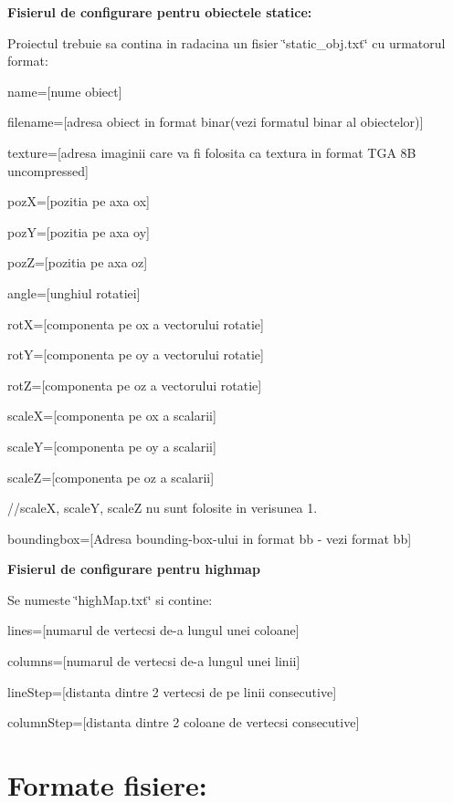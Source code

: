 {\bfseries Fisierul de configurare pentru obiectele statice\-:}\par
 Proiectul trebuie sa contina in radacina un fisier \char`\"{}static\-\_\-obj.\-txt\char`\"{} cu urmatorul format\-:\par
 name=\mbox{[}nume obiect\mbox{]}\par
 filename=\mbox{[}adresa obiect in format binar(vezi formatul binar al obiectelor)\mbox{]}\par
 texture=\mbox{[}adresa imaginii care va fi folosita ca textura in format T\-G\-A 8\-B uncompressed\mbox{]}\par
 poz\-X=\mbox{[}pozitia pe axa ox\mbox{]}\par
 poz\-Y=\mbox{[}pozitia pe axa oy\mbox{]}\par
 poz\-Z=\mbox{[}pozitia pe axa oz\mbox{]}\par
 angle=\mbox{[}unghiul rotatiei\mbox{]}\par
 rot\-X=\mbox{[}componenta pe ox a vectorului rotatie\mbox{]}\par
 rot\-Y=\mbox{[}componenta pe oy a vectorului rotatie\mbox{]}\par
 rot\-Z=\mbox{[}componenta pe oz a vectorului rotatie\mbox{]}\par
 scale\-X=\mbox{[}componenta pe ox a scalarii\mbox{]}\par
 scale\-Y=\mbox{[}componenta pe oy a scalarii\mbox{]}\par
 scale\-Z=\mbox{[}componenta pe oz a scalarii\mbox{]}\par
 //scale\-X, scale\-Y, scale\-Z nu sunt folosite in verisunea 1.\par
 boundingbox=\mbox{[}Adresa bounding-\/box-\/ului in format bb -\/ vezi format bb\mbox{]}\par
 {\bfseries Fisierul de configurare pentru highmap}\par
 Se numeste \char`\"{}high\-Map.\-txt\char`\"{} si contine\-:\par
 lines=\mbox{[}numarul de vertecsi de-\/a lungul unei coloane\mbox{]}\par
 columns=\mbox{[}numarul de vertecsi de-\/a lungul unei linii\mbox{]}\par
 line\-Step=\mbox{[}distanta dintre 2 vertecsi de pe linii consecutive\mbox{]}\par
 column\-Step=\mbox{[}distanta dintre 2 coloane de vertecsi consecutive\mbox{]}\par
 \section*{Formate fisiere\-:}

